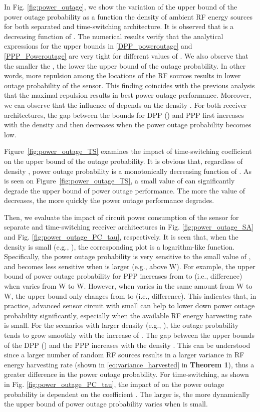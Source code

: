 \documentclass[12pt,draftclsnofoot,onecolumn]{IEEEtran}
\begin{document}
In Fig. \ref{fig:power_outage}, we show the variation of the upper bound of the power outage probability  as a function the density of ambient RF energy sources  for both separated and time-switching architecture. It is observed that  is a decreasing function of . 
The numerical results verify that the analytical expressions for the upper bounds in \eqref{DPP_poweroutage} and \eqref{PPP_Poweroutage} are very tight for different values of . We also observe that the smaller the , the lower the upper bound of the outage probability. In other words, more repulsion among the locations of the RF sources results in lower outage probability of the sensor. This finding coincides with the previous analysis that the maximal repulsion results in best power outage performance. 
Moreover, we can observe that the influence of  depends on the density . For both receiver architectures, the gap between the bounds for DPP () and PPP first increases with the density  and then decreases when the power outage probability becomes low.

Figure~\ref{fig:power_outage_TS} examines the impact of time-switching coefficient  on the upper bound of the outage probability. It is obvious that, regardless of density , power outage probability is a monotonically decreasing function of . 
As is seen on Figure~\ref{fig:power_outage_TS}, a small value of  can significantly degrade the upper bound of power outage performance. The more the value of  decreases, the more quickly the power outage performance degrades.  


Then, we evaluate the impact of circuit power consumption  of the sensor for separate and time-switching receiver architectures in Fig. \ref{fig:power_outage_SA} and Fig. \ref{fig:power_outage_PC_tau}, respectively. It is seen that, when the density  is small (e.g., ), the corresponding plot is a logarithm-like function. Specifically, the power outage probability is very sensitive to the small value of , and becomes less sensitive when  is larger (e.g., above W). For example, the upper bound of power outage probability for PPP increases from  to  (i.e.,  difference) when  varies from W to W. However, when  varies in the same amount from W to W, the upper bound only changes from  to  (i.e.,  difference). This indicates that, in practice, advanced sensor circuit with small  can help to lower down power outage probability significantly, especially when the available RF energy harvesting rate is small. For the scenarios with larger density  (e.g., ), the outage probability tends to grow smoothly with the increase of . The gap between the upper bounds of the DPP () and the PPP increases with the density . This can be understood since a larger number of random RF sources results in a larger variance in RF energy harvesting rate (shown in \eqref{eq:variance_harvested} in {\bf Theorem 1}), thus a greater difference in the power outage probability. For time-switching, as shown in Fig. \ref{fig:power_outage_PC_tau}, the impact of  on the power outage probability is dependent on the coefficient . The larger  is, the more dynamically the upper bound of power outage probability varies when  is small. 
\end{document}
